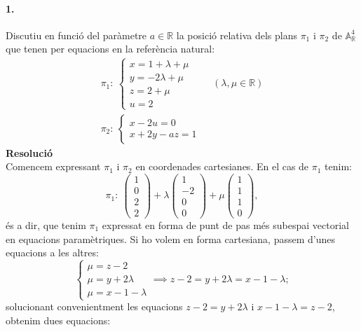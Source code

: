 \documentclass[11pt]{article}
\author{Àlex Batlle Casellas}
\newcommand{\af}{\mathbb{A}}
\begin{document}
\paragraph{1.}	Discutiu en funció del paràmetre $a\in\mathbb{R}$ la posició relativa dels plans $\pi_1$ i $\pi_2$ de $\af^4_{\mathbb{R}}$ que tenen per equacions en la referència natural:
\begin{align*}
	\pi_1:\ \begin{cases} x=1+\lambda+\mu \\ y=-2\lambda+\mu \\ z=2+\mu \\ u=2 \end{cases}\qquad (\lambda,\mu\in\mathbb{R}) \\
	\pi_2:\ \begin{cases} x-2u=0 \\ x+2y-az=1 \end{cases}
\end{align*}
\textbf{Resolució}\\
Comencem expressant $\pi_1$ i $\pi_2$ en coordenades cartesianes. En el cas de $\pi_1$ tenim:
\begin{equation}
\pi_1:\ \begin{pmatrix}
1\\ 0\\ 2\\ 2
\end{pmatrix}+\lambda\begin{pmatrix}
1\\ -2\\ 0\\ 0
\end{pmatrix}+\mu\begin{pmatrix}
1\\ 1\\ 1\\ 0
\end{pmatrix},
\end{equation}
és a dir, que tenim $\pi_1$ expressat en forma de punt de pas més subespai vectorial en equacions paramètriques. Si ho volem en forma cartesiana, passem d'unes equacions a les altres:
\begin{equation}
\begin{cases}\mu=z-2\\ \mu=y+2\lambda\\ \mu=x-1-\lambda\end{cases}\implies z-2=y+2\lambda=x-1-\lambda;
\end{equation}
solucionant convenientment les equacions $z-2=y+2\lambda$ i $x-1-\lambda=z-2$, obtenim dues equacions:
\end{document}
